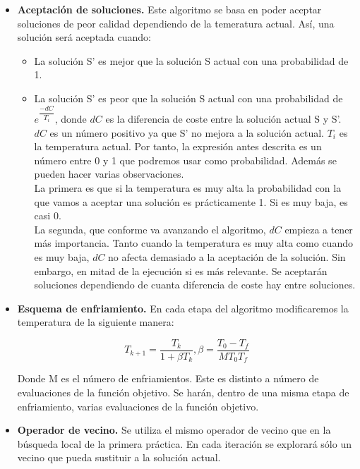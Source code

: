 \begin{itemize}
	\item \textbf{Aceptación de soluciones.} Este algoritmo se basa en poder aceptar soluciones de peor calidad dependiendo de la temeratura actual. Así, una solución será aceptada cuando:\\
	
	\begin{itemize}
		\item La solución S' es mejor que la solución S actual con una probabilidad de 1.
		\item La solución S' es peor que la solución S actual con una probabilidad de $ e^{\dfrac{-dC}{T_i}}$, donde $dC$ es la diferencia de coste entre la solución actual S y S'. $dC$ es un número positivo ya que S' no mejora a la solución actual. $T_i$ es la temperatura actual. Por tanto, la expresión antes descrita es un número entre 0 y 1 que podremos usar como probabilidad. Además se pueden hacer varias observaciones.\\
		
		La primera es que si la temperatura es muy alta la probabilidad con la que vamos a aceptar una solución es prácticamente 1. Si es muy baja, es casi 0. \\
		
		La segunda, que conforme va avanzando el algoritmo, $dC$ empieza a tener más importancia. Tanto cuando la temperatura es muy alta como cuando es muy baja, $dC$ no afecta demasiado a la aceptación de la solución. Sin embargo, en mitad de la ejecución si es más relevante. Se aceptarán soluciones dependiendo de cuanta diferencia de coste hay entre soluciones.
	
	\end{itemize}
	\item \textbf{Esquema de enfriamiento.} En cada etapa del algoritmo modificaremos la temperatura de la siguiente manera:
	
	\[T_{k+1}=\dfrac{T_k}{1+\beta T_{k}},\beta = \dfrac{T_0-T_f}{MT_0T_f} \]
	 
	 Donde M es el número de enfriamientos. Este es distinto a número de evaluaciones de la función objetivo. Se harán, dentro de una misma etapa de enfriamiento, varias evaluaciones de la función objetivo.
	 
	 \item \textbf{Operador de vecino.} Se utiliza el mismo operador de vecino que en la búsqueda local de la primera práctica. En cada iteración se explorará sólo un vecino que pueda sustituir a la solución actual.
	 

\end{itemize}
